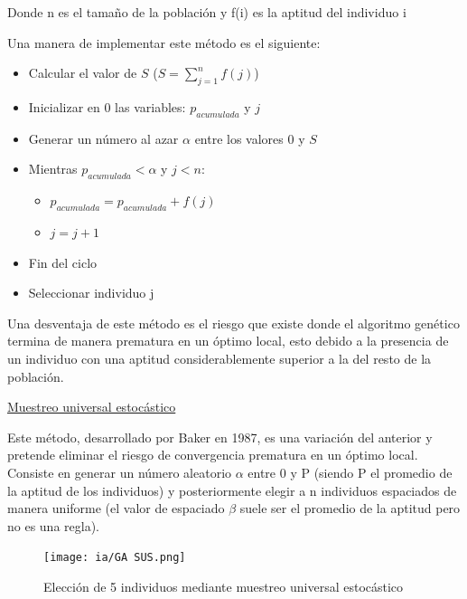 \documentclass[11pt,fleqn]{book} %
\begin{document}
Donde n es el tamaño de la población y f(i) es la aptitud del individuo i

Una manera de implementar este método es el siguiente:
\begin{itemize}
\item Calcular el valor de $S$ ($S = \sum_{j=1}^{n} f(j)$)
\item Inicializar en 0 las variables: $p_{acumulada}$ y $j$
\item Generar un número al azar $\alpha$ entre los valores 0 y $S$
\item Mientras $p_{acumulada}<\alpha$  y   $j<n$:

\begin{itemize}
\item $p_{acumulada} = p_{acumulada} + f(j)$
\item $j = j+1$
\end{itemize}

\item Fin del ciclo
\item Seleccionar individuo j
\end{itemize}

Una desventaja de este método es el riesgo que existe donde el algoritmo genético termina de manera prematura en un óptimo local, esto debido a la presencia de un individuo con una aptitud considerablemente superior a la del resto de la población.

\underline{Muestreo universal estocástico}

Este método, desarrollado por Baker en 1987, es una variación del anterior y pretende eliminar el riesgo de convergencia prematura en un óptimo local.
Consiste en generar un número aleatorio $\alpha$ entre 0 y P (siendo P el promedio de la aptitud de los individuos) y posteriormente elegir a n individuos espaciados de manera uniforme (el valor de espaciado $\beta$ suele ser el promedio de la aptitud pero no es una regla).

\begin{figure}[ht]
\centering\texttt{[image: ia/GA SUS.png]}
\caption{Elección de 5 individuos mediante muestreo universal estocástico}
\label{fig:ga-sel-mue} 
\end{figure}

\clearpage
\end{document}
